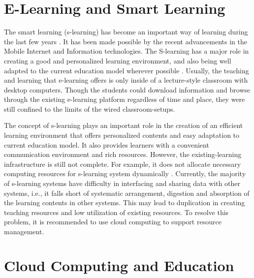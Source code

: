 \documentclass[journal]{vgtc}                %
\begin{document}

\section{E-Learning and Smart Learning}
The smart learning (s-learning) has become an important way of learning during the last few years \cite{Kim2013}. It has been made possible by the recent advancements in the Mobile Internet and Information technologies. The S-learning has a major role in creating a good and personalized learning environment, and also being well adapted to the current education model wherever possible \cite{Uden2007}. Usually, the teaching and learning that e-learning offers is only inside of a lecture-style classroom with desktop computers. Though the students could download information and browse through the existing e-learning platform regardless of time and place, they were still confined to the limits of the wired classroom-setups.

The concept of s-learning plays an important role in the creation of an efficient learning environment that offers personalized contents and easy adaptation to current education model. It also provides learners with a convenient communication environment and rich resources. However, the existing-learning infrastructure is still not complete. For example, it does not allocate necessary computing resources for s-learning system dynamically \cite{Kim2013}. Currently, the majority of s-learning systems have difficulty in interfacing and sharing data with other systems, i.e., it falls short of systematic arrangement, digestion and absorption of the learning contents in other systems. This may lead to duplication in creating teaching resources and low utilization of existing resources. To resolve this problem, it is recommended to use cloud computing to support resource management.

\section{Cloud Computing and Education}
\end{document}
